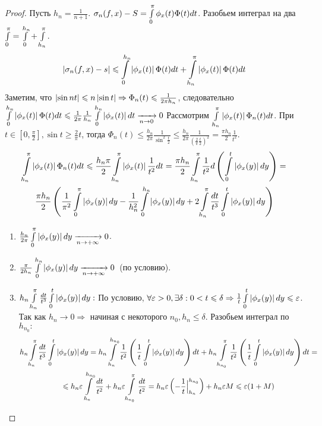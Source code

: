 \begin{proof}
	Пусть $h_n = \frac{1}{n + 1}$. $\sigma_n(f, x) - S 
	= \int\limits_{0}^{\pi} \phi_x(t)\Phi(t)dt$.
	Разобьем интеграл на два $\int\limits_{0}^{\pi} = \int\limits_{0}^{h_n} + \int\limits_{h_n}^{\pi}$.
	\begin{gather*}
		\left|\sigma_n(f, x) - s\right| \leqslant \int\limits_{0}^{h_n} \left|\phi_x(t)\right| \Phi(t)dt +
		\int\limits_{h_n}^{\pi} \left|\phi_x(t)\right| \Phi(t)dt
	\end{gather*}
	Заметим, что $\left|\sin nt\right| \leqslant n \left|\sin t\right| \Rightarrow \Phi_n(t) \leqslant 
	\frac{1}{2\pi h_n}$, следовательно $\int\limits_{0}^{h_n} \left|\phi_x(t)\right| \Phi(t)dt \leqslant
	\frac{1}{2\pi} \frac{1}{h_n} \int\limits_{0}^{h_n} \left|\phi_x(t)\right|dt 
	\xrightarrow[n \rightarrow 0]{} 0$  
	Рассмотрим $\int\limits_{h_n}^{\pi}\left|\phi_x(t)\right|\Phi_n(t)dt$.
	При $t \in \left[ 0, \frac{\pi}{2}\right], \sin t \geqslant \frac{2}{\pi}t$, 
	тогда $\Phi_n(t) \leqslant \frac{h_n}{2\pi} \frac{1}{\sin^2\frac{t}{2}} \leqslant
	\frac{h_n}{2\pi}\frac{1}{\left(\frac{2}{\pi} \frac{t}{2} \right)^2} = \frac{\pi h_n}{2} \frac{1}{t^2}$.
	\begin{gather*}
		\int\limits_{h_n}^{\pi}\left|\phi_x(t)\right|\Phi_n(t)dt \leqslant 
		\frac{h_n\pi}{2}\int\limits_{h_n}^{\pi}\left|\phi_x(t)\right|\frac{1}{t^2}dt
		= \frac{\pi h_n}{2} \int\limits_{h_n}^{\pi} \frac{1}{t^2}d\left( \int\limits_{0}^{t} \left|\phi_x(y)\right| dy\right) = \\
		\frac{\pi h_n}{2}\left( \frac{1}{\pi^2}\int\limits_{0}^{\pi} \left|\phi_x(y)\right|dy - 
		\frac{1}{h_n^2}\int\limits_{0}^{h_n}\left|\phi_x(y)\right| dy + 2\int\limits_{h_n}^{\pi} 
		\frac{dt}{t^3}\int\limits_{0}^{t}\left|\phi_x(y)\right|dy\right) 
	\end{gather*}
	
	\newpage

	\begin{enumerate}
		\item $\frac{h_n}{2\pi}\int\limits_{0}^{\pi} \left|\phi_x(y)\right|dy \xrightarrow[n \rightarrow +\infty]{} 0$.
		\item $\frac{\pi}{2h_n}\int\limits_{0}^{h_n}\left|\phi_x(y)\right| dy \xrightarrow[n \rightarrow +\infty]{} 0\:$
			(по условию). 
		\item $h_n\int\limits_{h_n}^{\pi} \frac{dt}{t^3}\int\limits_{0}^{t}\left|\phi_x(y)\right|dy:$
			По условию, $\forall\varepsilon >0 , \exists \delta : 0 < t \leqslant 
			\delta \Rightarrow \frac{1}{t}\int\limits_{0}^{t}\left|\phi_x(y)\right|dy \leqslant \varepsilon$.
			Так как $h_n \rightarrow 0 \Rightarrow$ начиная с некоторого $n_0, h_n \leqslant \delta$. 
			Разобьем интеграл по $h_{n_0}:$
			\begin{gather*}
				h_n\int\limits_{h_n}^{\pi} \frac{dt}{t^3}\int\limits_{0}^{t}\left|\phi_x(y)\right|dy = 
				h_n \int\limits_{h_n}^{h_{n_0}} \frac{1}{t^2}\left( 
				\frac{1}{t}\int\limits_{0}^{t}\left|\phi_x(y)\right|dy \right) dt
				+ h_n \int\limits_{h_{n_0}}^{\pi} \frac{1}{t^2} 
				\left( \frac{1}{t}\int\limits_{0}^{t}\left|\phi_x(y)\right|dy \right) dt = \\
				\leqslant h_n \varepsilon \int\limits_{h_n}^{h_{n_0}}\frac{dt}{t^2} + 
				h_n \varepsilon \int\limits_{h_{n_0}}^{\pi} \frac{dt}{t^2} =
				h_n \varepsilon \left( -\frac{1}{t}\Big|_{h_n}^{h_{n_0}}\right) + h_n \varepsilon M
				\leqslant \varepsilon (1 + M)
			\end{gather*}
	\end{enumerate}
\end{proof}

